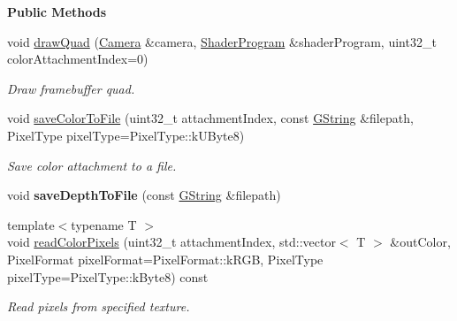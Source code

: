 \begin{Indent}\textbf{ Public Methods}\par
\begin{DoxyCompactItemize}
\item 
\mbox{\label{classrev_1_1_frame_buffer_a479b257f5ddbdafbc532b1c4322f965e}} 
void \mbox{\hyperlink{classrev_1_1_frame_buffer_a479b257f5ddbdafbc532b1c4322f965e}{draw\+Quad}} (\mbox{\hyperlink{classrev_1_1_camera}{Camera}} \&camera, \mbox{\hyperlink{classrev_1_1_shader_program}{Shader\+Program}} \&shader\+Program, uint32\+\_\+t color\+Attachment\+Index=0)
\begin{DoxyCompactList}\small\item\em Draw framebuffer quad. \end{DoxyCompactList}\item 
\mbox{\label{classrev_1_1_frame_buffer_a79b6c304ccde1ea5c35dee38dc77d483}} 
void \mbox{\hyperlink{classrev_1_1_frame_buffer_a79b6c304ccde1ea5c35dee38dc77d483}{save\+Color\+To\+File}} (uint32\+\_\+t attachment\+Index, const \mbox{\hyperlink{classrev_1_1_g_string}{G\+String}} \&filepath, Pixel\+Type pixel\+Type=Pixel\+Type\+::k\+U\+Byte8)
\begin{DoxyCompactList}\small\item\em Save color attachment to a file. \end{DoxyCompactList}\item 
\mbox{\label{classrev_1_1_frame_buffer_a09fa1bc5c40ba79cead2fa3539bb731c}} 
void {\bfseries save\+Depth\+To\+File} (const \mbox{\hyperlink{classrev_1_1_g_string}{G\+String}} \&filepath)
\item 
\mbox{\label{classrev_1_1_frame_buffer_a1bdfde536436ce5056b1972e9e65072e}} 
{\footnotesize template$<$typename T $>$ }\\void \mbox{\hyperlink{classrev_1_1_frame_buffer_a1bdfde536436ce5056b1972e9e65072e}{read\+Color\+Pixels}} (uint32\+\_\+t attachment\+Index, std\+::vector$<$ T $>$ \&out\+Color, Pixel\+Format pixel\+Format=Pixel\+Format\+::k\+R\+GB, Pixel\+Type pixel\+Type=Pixel\+Type\+::k\+Byte8) const
\begin{DoxyCompactList}\small\item\em Read pixels from specified texture. \end{DoxyCompactList}\item 

\end{DoxyCompactItemize}
\end{Indent}
